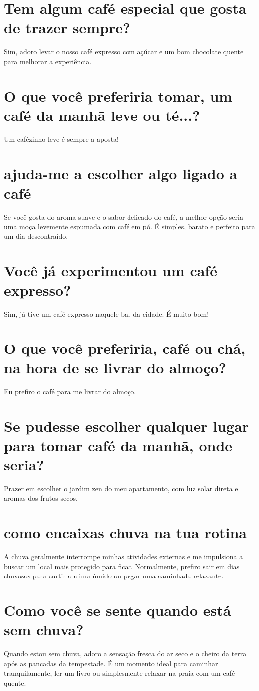 \documentclass[11pt,a4paper]{article}
\begin{document}
\section{Tem algum café especial que gosta de trazer sempre?}
Sim, adoro levar o nosso café expresso com açúcar e um bom chocolate quente para melhorar a experiência.

\section{O que você preferiria tomar, um café da manhã leve ou té...?}
Um cafézinho leve é sempre a aposta!

\section{ajuda-me a escolher algo ligado a café}
Se você gosta do aroma suave e o sabor delicado do café, a melhor opção seria uma moça levemente espumada com café em pó. É simples, barato e perfeito para um dia descontraído.

\section{Você já experimentou um café expresso?}
Sim, já tive um café expresso naquele bar da cidade. É muito bom!

\section{O que você preferiria, café ou chá, na hora de se livrar do almoço?}
Eu prefiro o café para me livrar do almoço.

\section{Se pudesse escolher qualquer lugar para tomar café da manhã, onde seria?}
Prazer em escolher o jardim zen do meu apartamento, com luz solar direta e aromas dos frutos secos.

\section{como encaixas chuva na tua rotina}
A chuva geralmente interrompe minhas atividades externas e me impulsiona a buscar um local mais protegido para ficar. Normalmente, prefiro sair em dias chuvosos para curtir o clima úmido ou pegar uma caminhada relaxante.

\section{Como você se sente quando está sem chuva?}
Quando estou sem chuva, adoro a sensação fresca do ar seco e o cheiro da terra após as pancadas da tempestade. É um momento ideal para caminhar tranquilamente, ler um livro ou simplesmente relaxar na praia com um café quente.
\end{document}
